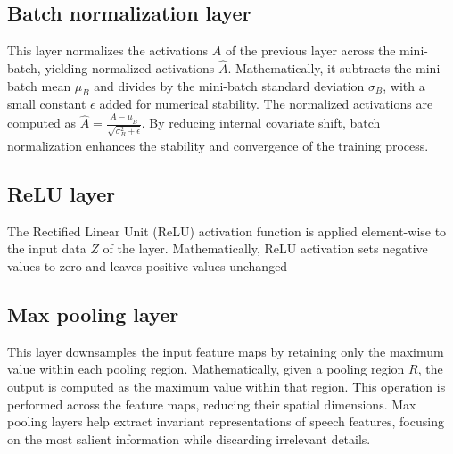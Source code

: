 \documentclass[a4paper]{report}
\begin{document}
{\subsection{Batch normalization layer}
This layer normalizes the activations $A$ of the previous layer across the mini-batch, yielding normalized activations $\hat{A}$. Mathematically, it subtracts the mini-batch mean $\mu_B$ and divides by the mini-batch standard deviation $\sigma_B$, with a small constant $\epsilon$ added for numerical stability. The normalized activations are computed as $\hat{A} = \frac{A - \mu_B}{\sqrt{\sigma_B^2 + \epsilon}}$. By reducing internal covariate shift, batch normalization enhances the stability and convergence of the training process.

\subsection{ReLU layer}
The Rectified Linear Unit (ReLU) activation function is applied element-wise to the input data $Z$ of the layer. Mathematically, ReLU activation sets negative values to zero and leaves positive values unchanged
\begin{center}
\end{center}
\subsection{Max pooling layer}
This layer downsamples the input feature maps by retaining only the maximum value within each pooling region. Mathematically, given a pooling region $R$, the output is computed as the maximum value within that region. This operation is performed across the feature maps, reducing their spatial dimensions. Max pooling layers help extract invariant representations of speech features, focusing on the most salient information while discarding irrelevant details.

}
\end{document}
